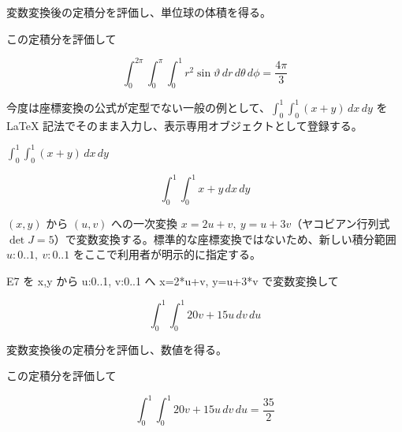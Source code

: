 \documentclass[dvipdfmx,a4paper,11pt]{jsarticle}
\begin{document}
変数変換後の定積分を評価し、単位球の体積を得る。

この定積分を評価して

\begin{equation}
  \int_{0}^{2\pi} \int_{0}^{\pi} \int_{0}^{1} r^2 \sin \vartheta \, dr \, d\theta \, d\phi = \frac{4 \pi}{3}
  \label{eq:E6}
\end{equation}

今度は座標変換の公式が定型でない一般の例として、$\int_0^1\int_0^1(x+y)\,dx\,dy$ を LaTeX 記法でそのまま入力し、表示専用オブジェクトとして登録する。

$\int_{0}^{1} \int_{0}^{1} (x+y) \, dx \, dy$

\begin{equation}
  \int_{0}^{1} \int_{0}^{1} x+y \, dx \, dy
  \label{eq:E7}
\end{equation}

$(x,y)$ から $(u,v)$ への一次変換 $x=2u+v,\ y=u+3v$（ヤコビアン行列式 $\det J=5$）で変数変換する。標準的な座標変換ではないため、新しい積分範囲 $u:0..1,\ v:0..1$ をここで利用者が明示的に指定する。

E7 を x,y から u:0..1, v:0..1 へ x=2*u+v, y=u+3*v で変数変換して

\begin{equation}
  \int_{0}^{1} \int_{0}^{1} 20 v+15 u \, dv \, du
  \label{eq:E8}
\end{equation}

変数変換後の定積分を評価し、数値を得る。

この定積分を評価して

\begin{equation}
  \int_{0}^{1} \int_{0}^{1} 20 v+15 u \, dv \, du = \frac{35}{2}
  \label{eq:E9}
\end{equation}
\end{document}
